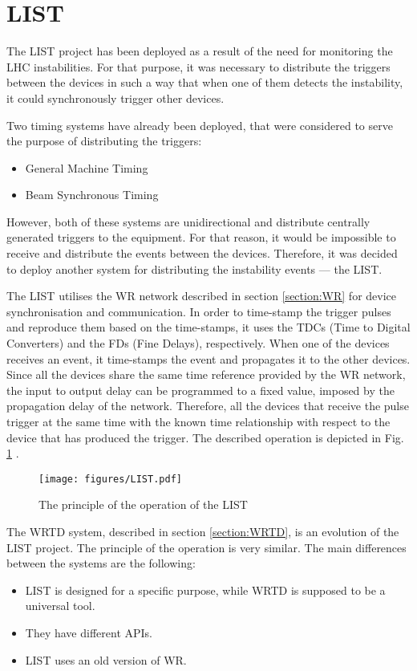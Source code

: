 \section{LIST}
    The LIST project has been deployed as a result of the need for monitoring the LHC instabilities. For that purpose, it was necessary to distribute the triggers between the devices in such a way that when one of them detects the instability, it could synchronously trigger other devices. 
    
    Two timing systems have already been deployed, that were considered to serve the purpose of distributing the triggers:
    \begin{itemize}
        \item General Machine Timing
        \item Beam Synchronous Timing
    \end{itemize}
    However, both of these systems are unidirectional and distribute centrally generated triggers to the equipment. For that reason, it would be impossible to receive and distribute the events between the devices. Therefore, it was decided to deploy another system for distributing the instability events --- the LIST. 
    
    The LIST utilises the WR network described in section \ref{section:WR} for device synchronisation and communication. In order to time-stamp the trigger pulses and reproduce them based on the time-stamps, it uses the TDCs (Time to Digital Converters) and the FDs (Fine Delays), respectively. When one of the devices receives an event, it time-stamps the event and propagates it to the other devices. Since all the devices share the same time reference provided by the WR network, the input to output delay can be  programmed to a fixed value, imposed by the propagation delay of the network. Therefore, all the devices that receive the pulse trigger at the same time with the known time relationship with respect to the device that has produced the trigger. The described operation is depicted in Fig. \ref{fig:list} \cite{LIST_instability_diagnostics}.
    \begin{figure}
    	\centerline{\texttt{[image: figures/LIST.pdf]}}
    	\caption{The principle of the operation of the LIST}
    	\label{fig:list}
    \end{figure}
    
    The WRTD system, described in section \ref{section:WRTD}, is an evolution of the LIST project. The principle of the operation is very similar. The main differences between the systems are the following:
    \begin{itemize}
        \item LIST is designed for a specific purpose, while WRTD is supposed to be a universal tool. 
        \item They have different APIs.
        \item LIST uses an old version of WR.
    \end{itemize}


